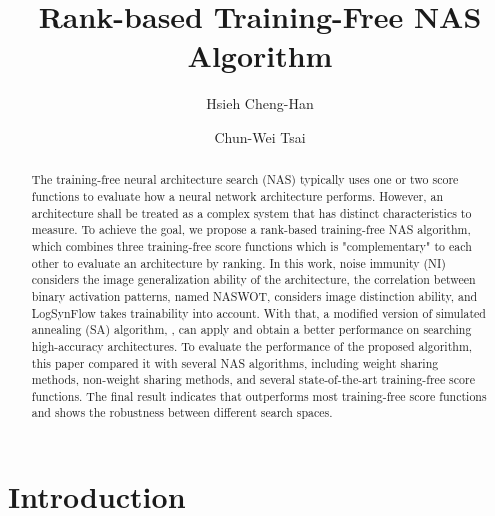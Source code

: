 \documentclass[sigconf]{acmart}
\begin{document}
\title{Rank-based Training-Free NAS Algorithm}

\author{Hsieh Cheng-Han}

\author{Chun-Wei Tsai}

\begin{abstract}
    The training-free neural architecture search (NAS) typically uses one or 
    two score functions to evaluate how a neural network architecture performs. 
    However, an architecture shall be treated as a complex system that has 
    distinct characteristics to measure. 
    To achieve the goal, we propose a rank-based training-free NAS algorithm, 
    which combines three training-free score functions which is "complementary" 
    to each other to evaluate an architecture by ranking. 
    In this work, noise immunity (NI) considers the image generalization 
    ability of the architecture, the correlation between binary activation 
    patterns, named NASWOT, considers image distinction ability, and LogSynFlow 
    takes trainability into account. With that, a modified version of simulated 
    annealing (SA) algorithm, \palg{}, can apply and obtain a better 
    performance on searching high-accuracy architectures. 
    To evaluate the performance of the proposed algorithm, this paper compared 
    it with several NAS algorithms, including weight sharing methods, 
    non-weight sharing methods, and several state-of-the-art training-free 
    score functions. The final result indicates that \palg{} outperforms most 
    training-free score functions and shows the robustness between different 
    search spaces. 

\end{abstract}
\maketitle

\section{Introduction}
\label{sec:introduction}
\end{document}
